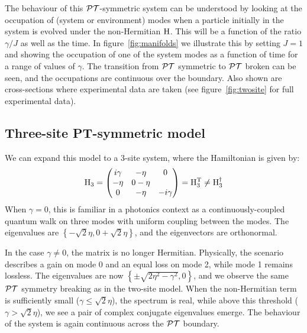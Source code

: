 The behaviour of this \(\mathcal{PT}{}\)-symmetric system can be understood by looking at
the occupation of (system or environment) modes when a particle initially in the
system is evolved under the non-Hermitian \(\mathrm{H}\). This will be a function
of the ratio \(\gamma/J\) as well as the time. In figure~\ref{fig:manifolds} we
illustrate this by setting \(J=1\) and showing the occupation of one of the
system modes as a function of time for a range of values of \(\gamma\). The
transition from \(\mathcal{PT}{}\) symmetric to \(\mathcal{PT}{}\) broken can be seen, and the
occupations are continuous over the boundary. Also shown are cross-sections
where experimental data are taken (see figure~\ref{fig:twosite} for full
experimental data).

\subsection{Three-site PT-symmetric model}
\label{sec:ThreeSite}
We can expand this model to a 3-site system, where the Hamiltonian is given by:
\begin{equation}
  \mathrm{H}_{3} = \begin{pmatrix}
    i \gamma & -\eta & 0 \\
    -\eta & 0 -\eta \\
    0 & -\eta & -i \gamma \\
  \end{pmatrix} = \mathrm{H}_{3}^{\mathrm{T}} \neq \mathrm{H}_{3}^{\dagger}
\end{equation}
When \(\gamma=0\), this is familiar in a photonics context as a
continuously-coupled quantum walk on three modes with uniform coupling between
the modes. The eigenvalues are \(\left\{ -\sqrt{2} \eta, 0 +\sqrt{2}
\eta\right\}\), and the eigenvectors are orthonormal.

In the case \(\gamma \neq 0\), the matrix is no longer Hermitian. Physically,
the scenario describes a gain on mode 0 and an equal loss on mode 2, while
mode 1 remains lossless. The eigenvalues are now \(\left\{ \pm \sqrt{2 \eta^{2}
- \gamma^{2}}, 0 \right\}\), and we observe the same \(\mathcal{PT}\) symmetry breaking
as in the two-site model. When the non-Hermitian term is sufficiently small
(\(\gamma \leq \sqrt{2} \eta\)), the spectrum is real, while above this
threshold (\(\gamma > \sqrt{2} \eta\)), we see a pair of complex conjugate
eigenvalues emerge. The behaviour of the system is again continuous across the
\(\mathcal{PT}\) boundary.


